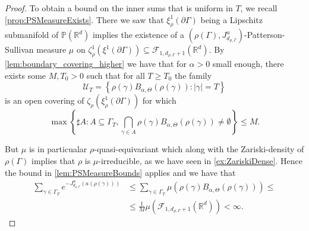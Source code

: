 \documentclass{report}
\begin{document}
\begin{proof}
    To obtain a bound on the inner sums that is uniform in $T$, we recall \cref{prop:PSMeasureExists}. 
    There we saw that $\xi^1_\rho(\partial \Gamma)$ being a Lipschitz submanifold of $\mathbb P(\mathbb R^d)$ implies the existence of a $(\rho(\Gamma), J_{d_{\rho, \Gamma}}^u)$-Patterson-Sullivan measure $\mu$ on $\zeta^1_\rho(\xi^1(\partial \Gamma)) \subseteq \mathcal F_{1, d_{\rho, \Gamma} + 1}(\mathbb R^d)$.
    By \cref{lem:boundary_covering_higher} we have that for $\alpha > 0$ small enough, there exists some $M, T_0 > 0$ such that for all $T \geq T_0$ the family
    \[
        \mathcal U_T = \left\{ \rho(\gamma) B_{\alpha, \Theta}(\rho(\gamma)) : |\gamma| = T \right\}
    \]
    is an open covering of $\zeta_\rho(\xi^1_\rho(\partial \Gamma))$ for which
    \[
        \max
        \left\{\sharp A : A \subseteq \Gamma_T,  \bigcap_{\gamma \in A}\rho(\gamma)B_{\alpha, \Theta}(\rho(\gamma)) \neq \emptyset \right\} \leq M.
    \]

    But $\mu$ is in particualar $\rho$-quasi-equivariant which along with the Zariski-density of $\rho(\Gamma)$ implies that $\rho$ is $\mu$-irreducible, as we have seen in \cref{ex:ZariskiDense}.
    Hence the bound in \cref{lem:PSMeasureBounds} applies and we have that
    \begin{align*}
        \sum_{\gamma \in \Gamma_T} e^{-J_{d_{\rho, \Gamma}}^u(a(\rho(\gamma)))} &\leq
        \sum_{\gamma \in \Gamma_T} \mu\left(\rho(\gamma) B_{\alpha, \Theta}(\rho(\gamma))\right) \leq\\
        &\leq
        \frac{1}{M} \mu\left(\mathcal F_{1, d_{\rho, \Gamma} + 1}(\mathbb R^d)\right) < \infty.
    \end{align*}

    
\end{proof}

\appendix
\end{document}
